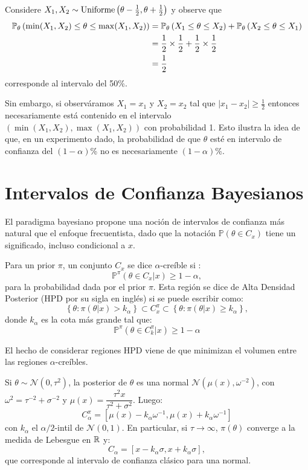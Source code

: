 \begin{example} Considere $X_1,X_2\sim\text{Uniforme}\left(\theta-\tfrac{1}{2},\theta+\tfrac{1}{2}\right)$ y observe que 
\begin{align*}
	\mathbb{P}_\theta \left(\min(X_1,X_2) \leq \theta \leq \max(X_1,X_2)\right) 
		&= \mathbb{P}_\theta \left( X_1 \leq \theta \leq X_2\right)  + \mathbb{P}_\theta \left( X_2 \leq \theta \leq X_1\right) \\
		&= \frac{1}{2}\times \frac{1}{2} + \frac{1}{2}\times\frac{1}{2}\\
		&= \frac{1}{2}
\end{align*}
corresponde al intervalo del 50\%. 

Sin embargo, si observáramos $X_1 = x_1$ y $X_2 = x_2$ tal que $|x_1-x_2|\geq\tfrac{1}{2}$ entonces necesariamente está contenido en el intervalo $(\min(X_1,X_2) , \max(X_1,X_2))$ con probabilidad 1. Esto ilustra la idea de que, en un experimento dado, la probabilidad de que $\theta$ esté en intervalo de confianza del $(1-\alpha)$\% no es necesariamente $(1-\alpha)$\%.
\end{example}

\section{Intervalos de Confianza Bayesianos}
El paradigma bayesiano propone una noción de intervalos de confianza más natural que el enfoque frecuentista, dado que la notación $\mathbb{P}(\theta \in C_x)$ tiene un significado, incluso condicional a $x$.
\begin{definition}
Para un prior $\pi$, un conjunto $C_x$ se dice  $\alpha$-creíble si :
$$
\mathbb{P}^{\pi}(\theta \in C_x |x) \geq 1- \alpha,
$$
para la probabilidad dada por el prior $\pi$. Esta región se dice de Alta Densidad Posterior (HPD por su sigla en inglés) si se puede escribir como:
$$
\left \{\theta: \pi(\theta|x) > k_{\alpha} \right \} \subset C_{x}^{\pi} \subset \left \{ \theta: \pi(\theta|x) \geq  k_{\alpha}\right \} ,
$$
donde $k_{\alpha}$ es la cota más grande tal que: 
$$
\mathbb{P}^{\pi}(\theta \in C_{k}^{\pi}|x) \geq 1- \alpha
$$
\end{definition}
\begin{remark}
    El hecho de considerar regiones HPD viene de que minimizan el volumen entre las regiones $\alpha$-creíbles. 
\end{remark}

\begin{example}
Si $\theta \sim \mathcal{N}(0,\tau^{2})$, la posterior de $\theta$ es una normal $\mathcal{N}(\mu(x),\omega^{-2})$, con $\omega^{2}= \tau^{-2} + \sigma^{-2} $
y $\mu(x)=\dfrac{\tau^{2}x}{\tau^2 + \sigma^2}$. Luego: 
$$
C_{\alpha}^{\pi} =[\mu(x) - k_{\alpha}\omega^{-1},\mu(x)+k_{\alpha}\omega^{-1} ]
$$
con $k_{\alpha}$ el $\alpha /2 $-intil de $\mathcal{N}(0,1)$. En particular, si $\tau \to \infty$, $\pi(\theta)$ converge a la medida de Lebesgue en ${\mathbb R} $ y: 
$$
C_{\alpha}= [x - k_{\alpha}\sigma ,x + k_{\alpha}\sigma],
$$
que corresponde al intervalo de confianza clásico para una normal. 
\end{example}